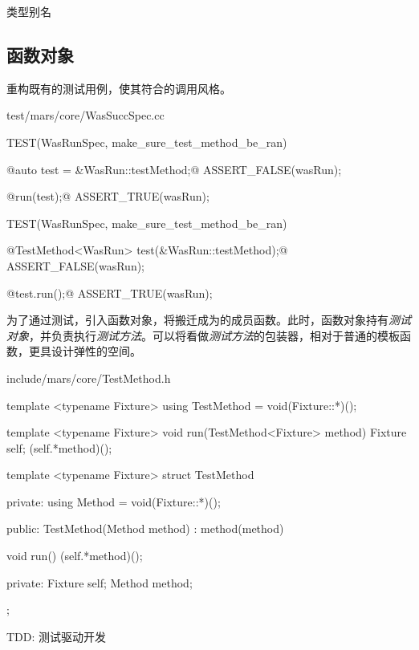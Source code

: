 \begin{content}
\begin{episode}{类型别名}
\begin{content}
\end{content}
\end{episode}

\subsection{函数对象}

重构既有的测试用例，使其符合的调用风格。

\begin{diff}{test/mars/core/WasSuccSpec.cc}
\begin{minicpp}
TEST(WasRunSpec, make_sure_test_method_be_ran) {
  @auto test = &WasRun::testMethod;@  
  ASSERT_FALSE(wasRun);

  @run(test);@
  ASSERT_TRUE(wasRun);
}
\end{minicpp}
\tcblower
\begin{minicpp}
TEST(WasRunSpec, make_sure_test_method_be_ran) {
  @TestMethod<WasRun> test(&WasRun::testMethod);@
  ASSERT_FALSE(wasRun);

  @test.run();@
  ASSERT_TRUE(wasRun);
}
\end{minicpp}
\end{diff}

为了通过测试，引入函数对象，将搬迁成为的成员函数。此时，函数对象持有\emph{测试对象}，并负责执行\emph{测试方法}。可以将看做\emph{测试方法}的包装器，相对于普通的模板函数，更具设计弹性的空间。

\begin{diff}{include/mars/core/TestMethod.h}
\begin{minicpp}
template <typename Fixture>
using TestMethod = void(Fixture::*)();

template <typename Fixture>
void run(TestMethod<Fixture> method) {
  Fixture self;
  (self.*method)();
}
\end{minicpp}
\tcblower
\begin{minicpp}
template <typename Fixture>
struct TestMethod {
private:
  using Method = void(Fixture::*)();

public:
  TestMethod(Method method)
    : method(method) {}

  void run() {
    (self.*method)();
  }

private:
  Fixture self;
  Method method;
};
\end{minicpp}
\end{diff}

\begin{episode}{TDD: 测试驱动开发}
\begin{content}


\end{content}
\end{episode}
\end{content}
